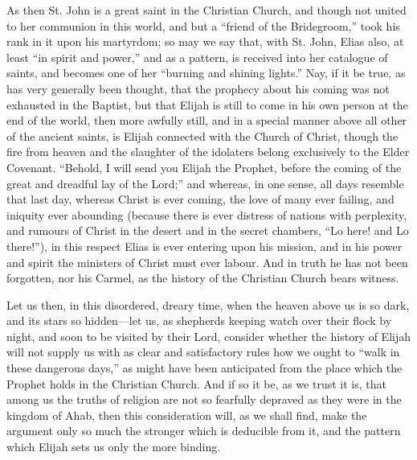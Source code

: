 As then St. John is a great saint in the Christian Church, and
though not united to her communion in this world, and but a
``friend of the Bridegroom,'' took his rank in it upon his
martyrdom; so may we say that, with St. John, Elias also, at least
``in spirit and power,'' and as a pattern, is received into
her catalogue of saints, and becomes one of her ``burning and
shining lights.'' Nay, if it be true, as has very generally been
thought, that the prophecy about his coming was not exhausted in the
Baptist, but that Elijah is still to come in his own person at the end
of the world, then more awfully still, and in a special manner above
all other of the ancient saints, is Elijah connected with the Church
of Christ, though the fire from heaven and the slaughter of the
idolaters belong exclusively to the Elder Covenant. ``Behold, I
will send you Elijah the Prophet, before the coming of the great and
dreadful lay of the Lord;'' and whereas, in one sense, all days
resemble that last day, whereas Christ is ever coming, the love of
many ever failing, and iniquity ever abounding (because there is ever
distress of nations with perplexity, and rumours of Christ in the
desert and in the secret chambers, ``Lo here! and Lo
there!''), in this respect Elias is ever entering upon his
mission, and in his power and spirit the ministers of Christ must ever
labour. And in truth he has not been forgotten, nor his Carmel, as the
history of the Christian Church bears witness.

Let us then, in this disordered, dreary time, when the heaven above
us is so dark, and its stars so hidden—let us, as shepherds keeping
watch over their flock by night, and soon to be visited by their Lord,
consider whether the history of Elijah will not supply us with as
clear and satisfactory rules how we ought to ``walk in these
dangerous days,'' as might have been anticipated from the place
which the Prophet holds in the Christian Church. And if so it be, as
we trust it is, that among us the truths of religion are not so
fearfully depraved as they were in the kingdom of Ahab, then this
consideration will, as we shall find, make the argument only so much
the stronger which is deducible from it, and the pattern which Elijah
sets us only the more binding.

